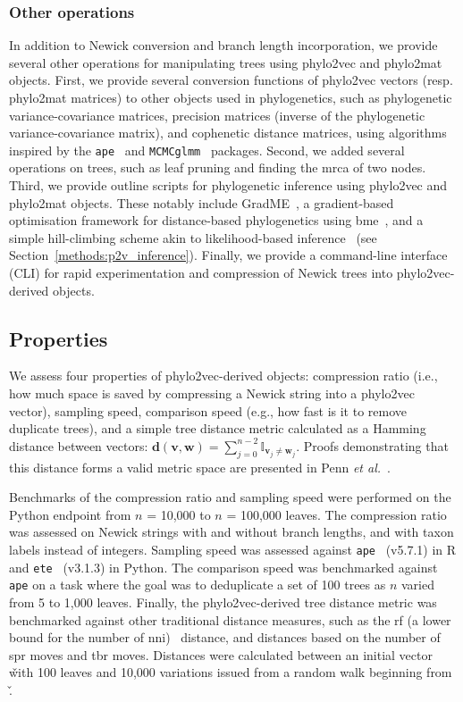 \subsubsection{Other operations}
\label{methods:p2v_other}

In addition to Newick conversion and branch length incorporation, we provide several other operations for manipulating trees using phylo2vec and phylo2mat objects. First, we provide several conversion functions of phylo2vec vectors (resp. phylo2mat matrices) to other objects used in phylogenetics, such as phylogenetic variance-covariance matrices, precision matrices (inverse of the phylogenetic variance-covariance matrix), and cophenetic distance matrices, using algorithms inspired by the \texttt{ape}~\cite{paradis2019} and \texttt{MCMCglmm}~\cite{hadfield2010} packages. Second, we added several operations on trees, such as leaf pruning and finding the \gls{mrca} of two nodes. Third, we provide outline scripts for phylogenetic inference using phylo2vec and phylo2mat objects. These notably include GradME~\cite{penn2023}, a gradient-based optimisation framework for distance-based phylogenetics using \gls{bme}~\cite{pauplin2000}, and a simple hill-climbing scheme akin to likelihood-based inference~\cite{penn2025} (see Section~\ref{methods:p2v_inference}). Finally, we provide a command-line interface (CLI) for rapid experimentation and compression of Newick trees into phylo2vec-derived objects.

\subsection{Properties}
\label{methods:p2v_properties}

We assess four properties of phylo2vec-derived objects: compression ratio (i.e., how much space is saved by compressing a Newick string into a phylo2vec vector), sampling speed, comparison speed (e.g., how fast is it to remove duplicate trees), and a simple tree distance metric calculated as a Hamming distance between vectors: $\bm{d}(\bm{v}, \bm{w}) = \sum_{j=0}^{n-2} \mathbb{I}_{\bm{v}_j\neq\bm{w}_j}$. Proofs demonstrating that this distance forms a valid metric space are presented in Penn \textit{et al.}~\cite{penn2025}.

Benchmarks of the compression ratio and sampling speed were performed on the Python endpoint from $n$ = 10,000 to $n$ = 100,000 leaves. The compression ratio was assessed on Newick strings with and without branch lengths, and with taxon labels instead of integers. Sampling speed was assessed against \texttt{ape}~\cite{paradis2019} (v5.7.1) in R and \texttt{ete}~\cite{huerta2016} (v3.1.3) in Python. The comparison speed was benchmarked against \texttt{ape} on a task where the goal was to deduplicate a set of 100 trees as $n$ varied from 5 to 1,000 leaves. Finally, the phylo2vec-derived tree distance metric was benchmarked against other traditional distance measures, such as the \gls{rf} (a lower bound for the number of \gls{nni})~\cite{robinson1981} distance, and distances based on the number of \gls{spr} moves and \gls{tbr} moves. Distances were calculated between an initial vector \v with 100 leaves and 10,000 variations issued from a random walk beginning from \v.

